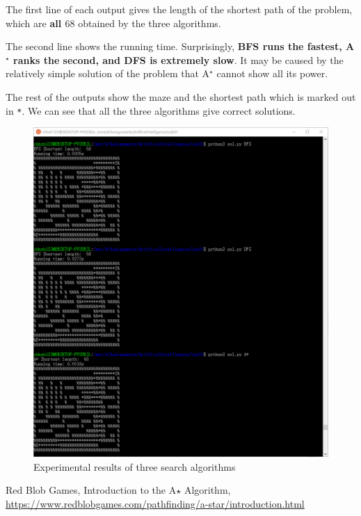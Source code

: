 \documentclass[a4paper, 11pt]{article}
\begin{document}
The first line of each output gives the length of the shortest path of the problem, which are \textbf{all $68$} obtained by the three algorithms.

The second line shows the running time.
Surprisingly, \textbf{BFS runs the fastest, A$^\star$ ranks the second, and DFS is extremely slow}.
It may be caused by the relatively simple solution of the problem that A$^\star$ cannot show all its power.

The rest of the outputs show the maze and the shortest path which is marked out in \verb'*'.
We can see that all the three algorithms give correct solutions.

\begin{figure}[H]
\centering
\includegraphics[width=\linewidth]{fig/results.png}
\caption{Experimental results of three search algorithms}
\label{fig:res}
\end{figure}


\begin{thebibliography}{99}
 Red Blob Games, Introduction to the A$\star$ Algorithm, \url{https://www.redblobgames.com/pathfinding/a-star/introduction.html}
\end{thebibliography}

%
%
\end{document}
